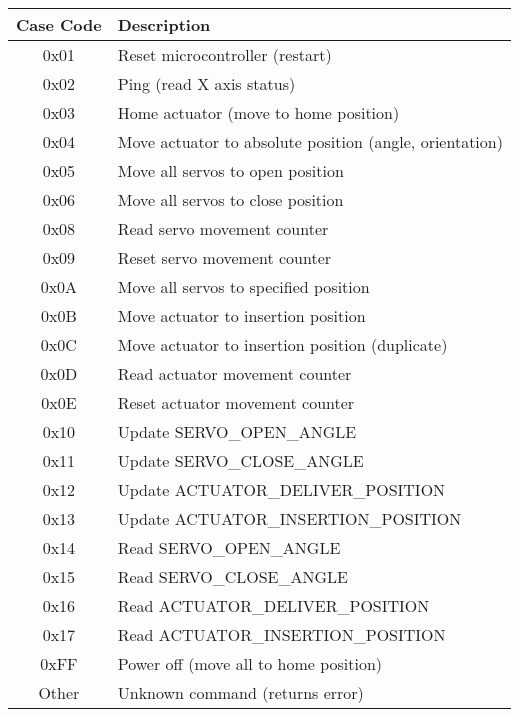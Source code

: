 \documentclass[12pt,a4paper]{article}
\begin{document}
\begin{longtable}{|c|p{8cm}|}
\hline
\textbf{Case Code} & \textbf{Description} \\
\hline
0x01 & Reset microcontroller (restart) \\
0x02 & Ping (read X axis status) \\
0x03 & Home actuator (move to home position) \\
0x04 & Move actuator to absolute position (angle, orientation) \\
0x05 & Move all servos to open position \\
0x06 & Move all servos to close position \\
0x08 & Read servo movement counter \\
0x09 & Reset servo movement counter \\
0x0A & Move all servos to specified position \\
0x0B & Move actuator to insertion position \\
0x0C & Move actuator to insertion position (duplicate) \\
0x0D & Read actuator movement counter \\
0x0E & Reset actuator movement counter \\
0x10 & Update SERVO\_OPEN\_ANGLE \\
0x11 & Update SERVO\_CLOSE\_ANGLE \\
0x12 & Update ACTUATOR\_DELIVER\_POSITION \\
0x13 & Update ACTUATOR\_INSERTION\_POSITION \\
0x14 & Read SERVO\_OPEN\_ANGLE \\
0x15 & Read SERVO\_CLOSE\_ANGLE \\
0x16 & Read ACTUATOR\_DELIVER\_POSITION \\
0x17 & Read ACTUATOR\_INSERTION\_POSITION \\
0xFF & Power off (move all to home position) \\
Other & Unknown command (returns error) \\
\hline
\end{longtable}

\end{document}
